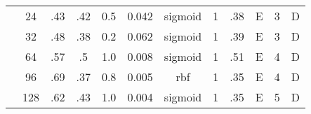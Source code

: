 \begin{table}
\begin{tabular}{|c|c|ccccc||ccccc|}
  &  24 &   .43 &  .42 & 0.5 &    0.042 & sigmoid &     1 &  .38 &      E & 3 &       D \\
  &  32 &   .48 &  .38 & 0.2 &    0.062 & sigmoid &     1 &  .39 &      E & 3 &       D \\
  &  64 &   .57 &   .5 & 1.0 &    0.008 & sigmoid &     1 &  .51 &      E & 4 &       D \\
  &  96 &   .69 &  .37 & 0.8 &    0.005 &     rbf &     1 &  .35 &      E & 4 &       D \\
  & 128 &   .62 &  .43 & 1.0 &    0.004 & sigmoid &     1 &  .35 &      E & 5 &       D \\\hline
\end{tabular}
\end{table}
